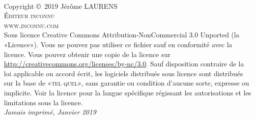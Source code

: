 
\newpage
~\vfill
\thispagestyle{empty}

\noindent Copyright \copyright\ 2019 Jérôme LAURENS\\ %

\noindent \textsc{Éditeur inconnu}\\ %

\noindent \textsc{www.inconnu.com}\\ %

\noindent Sous licence Creative Commons Attribution-NonCommercial 3.0 Unported (la «Licence»). Vous ne pouvez pas utiliser ce fichier sauf en conformité avec la licence. Vous pouvez obtenir une copie de la licence sur \url{http://creativecommons.org/licenses/by-nc/3.0}. Sauf disposition contraire de la loi applicable ou accord écrit, les logiciels distribués sous licence sont distribués sur la base de \textsc {«tel quel»}, sans garantie ou condition d'aucune sorte, expresse ou implicite. Voir la licence pour la langue spécifique régissant les autorisations et les limitations sous la licence.\\ %

\noindent \textit{Jamais imprimé, Janvier 2019} %
